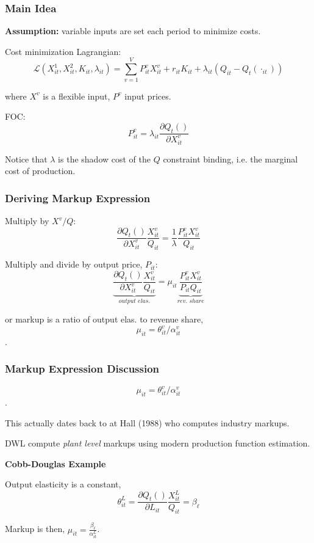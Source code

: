 \documentclass[11pt, aspectratio=169]{beamer}
\newenvironment{wideitemize}{\itemize\addtolength{\itemsep}{10pt}}{\enditemize}
\begin{document}
\begin{frame}[c]\frametitle{Main Idea}
    
\textbf{Assumption:} variable inputs are set each period to minimize costs. 

\bigskip
\begin{wideitemize}
	\item Cost minimization Lagrangian:
	$$\mathcal{L}(X^1_{it},X^2_{it},K_{it},\lambda_{it}) = \sum_{v=1}^V P^v_{it} X^v_{it} + r_{it}K_{it} + \lambda_{it}(Q_{it} - Q_{t}(\cdot_{it})) $$
	\item where $X^v$ is a flexible input, $P^v$ input prices.\pause
	\item FOC:
	$$ P^v_{it} = \lambda_{it}\frac{\partial Q_t()}{\partial X^v_{it} } $$
	\item Notice that $\lambda$ is the shadow cost of the $Q$ constraint binding, i.e. the marginal cost of production. 
\end{wideitemize}

\end{frame}


\begin{frame}[t]\frametitle{Deriving Markup Expression}
    

\begin{wideitemize}
	\item Multiply by $X^v/Q$:
	$$ \frac{\partial Q_t()}{\partial X^v_{it}} \frac{X^v_{it}}{Q_{it}} 
	= \frac{1}{\lambda} \frac{P^v_{it} X^v_{it}}{Q_{it}}$$\pause
	\item Multiply and divide by output price, $P_{it}$:
	$$ \underbrace{\frac{\partial Q_t()}{\partial X^v_{it}} \frac{X^v_{it}}{Q_{it}}}_{output\,\,elas.} 
	= \mu_{it} \underbrace{\frac{P^v_{it} X^v_{it}}{P_{it}Q_{it}}}_{rev.\,\,share}$$
	\item or markup is a ratio of output elas. to revenue share,
	$$ \mu_{it} = \theta^v_{it} / \alpha^v_{it} $$.
\end{wideitemize}

\end{frame}


\begin{frame}[c]\frametitle{Markup Expression Discussion}
    
	$$ \mu_{it} = \theta^v_{it} / \alpha^v_{it} $$.
\begin{wideitemize}
	\item This actually dates back to at Hall (1988) who computes industry markups. 
	\item DWL compute \emph{plant level} markups using modern production function estimation. 
\end{wideitemize}

\bigskip
\textbf{Cobb-Douglas Example}
\begin{wideitemize}
	\item Output elasticity is a constant,
	$$\theta^L_{it} = \frac{\partial Q_t()}{\partial L_{it}} \frac{X^L_{it}}{Q_{it}} = \beta_{\ell}$$
	\item Markup is then, $\mu_{it} = \frac{\beta_{\ell}}{\alpha^L_{it}}$.
\end{wideitemize}

\end{frame}
\end{document}
